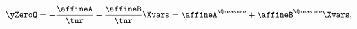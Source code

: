\begin{equation} \label{eq:nYaffineQ}
	\yZeroQ = - \frac{\affineA}{\tnr} - \frac{\affineB}{\tnr} \Xvars = \affineA^{\Qmeasure} + \affineB^{\Qmeasure} \Xvars,
\end{equation}